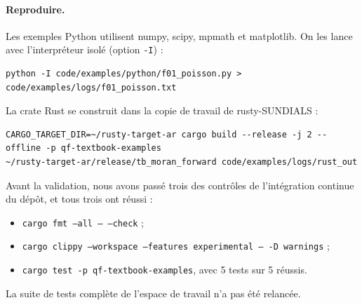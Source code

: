 \paragraph{Reproduire.} Les exemples Python utilisent numpy, scipy, mpmath et matplotlib. On les lance avec
l'interpréteur isolé (option \texttt{-I}) :
\begin{lstlisting}[language={}]
python -I code/examples/python/f01_poisson.py > code/examples/logs/f01_poisson.txt
\end{lstlisting}
La crate Rust se construit dans la copie de travail de rusty-SUNDIALS :
\begin{lstlisting}[language={}]
CARGO_TARGET_DIR=~/rusty-target-ar cargo build --release -j 2 --offline -p qf-textbook-examples
~/rusty-target-ar/release/tb_moran_forward code/examples/logs/rust_out
\end{lstlisting}
Avant la validation, nous avons passé trois des contrôles de l'intégration continue du dépôt, et tous trois ont
réussi :
\begin{itemize}
\item \texttt{cargo fmt --all -- --check} ;
\item \texttt{cargo clippy --workspace --features experimental -- -D warnings} ;
\item \texttt{cargo test -p qf-textbook-examples}, avec 5 tests sur 5 réussis.
\end{itemize}
La suite de tests complète de l'espace de travail n'a pas été relancée.

